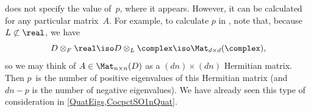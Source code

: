 \begin{rem}
 does not specify the value of~$p$, where it appears. However, it can be calculated for any particular matrix~$A$.
For example, to calculate $p$ in
, note that, because $L
\not\subset \real$, we have 
	$$D \otimes_F \real 
	\iso D \otimes_L \complex 
	\iso \Mat_{d \times d}(\complex) ,$$
so we may think of $A \in \Mat_{n
\times n}(D)$ as a $(dn) \times (dn)$ Hermitian matrix. Then
$p$~is the number of positive eigenvalues of this Hermitian
matrix (and $dn - p$ is the number of negative eigenvalues).
%
We have already seen this type of consideration in \cref{QuatEigs,CocpctSO1nQuat}.
\end{rem}






